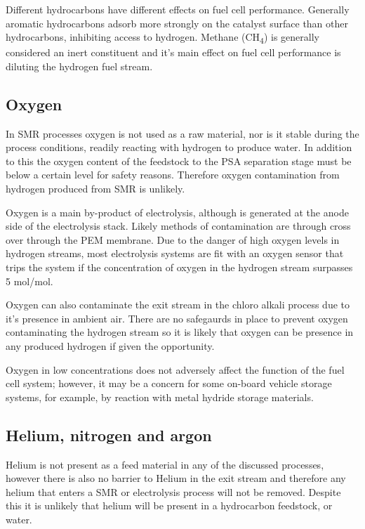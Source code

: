 Different hydrocarbons have different effects on fuel cell performance. Generally aromatic hydrocarbons adsorb more strongly on the catalyst surface than other hydrocarbons, inhibiting access to hydrogen.\cite{InternationalStandardISO14687-2:20122012} Methane (CH\textsubscript{4}) is generally considered an inert constituent and it's main effect on fuel cell performance is  diluting the hydrogen fuel stream. \cite{InternationalStandardISO14687-2:20122012}

\subsection*{Oxygen}
In SMR processes oxygen is not used as a raw material, nor is it stable during the process conditions, readily reacting with hydrogen to produce water. In addition to this the oxygen content of the feedstock to the PSA separation stage must be below a certain level for safety reasons. Therefore oxygen contamination from hydrogen produced from SMR is unlikely. 

Oxygen is a main by-product of electrolysis, although is generated at the anode side of the electrolysis stack. Likely methods of contamination are through cross over through the PEM membrane. Due to the danger of high oxygen levels in hydrogen streams, most electrolysis systems are fit with an oxygen sensor that trips the system if the concentration of oxygen in the hydrogen stream surpasses 5 \textmu mol/mol. \cite{Bacquart2018}

Oxygen can also contaminate the exit stream in the chloro alkali process due to it's presence in ambient air. There are no safegaurds in place to prevent oxygen contaminating the hydrogen stream so it is likely that oxygen can be presence in any produced hydrogen if given the opportunity.\cite{Bacquart2018} 

Oxygen in low concentrations does not adversely affect the function of the fuel cell system; however, it may be a concern for some on-board vehicle storage systems, for example, by reaction with metal hydride storage materials. \cite{InternationalStandardISO14687-2:20122012} 

\subsection*{Helium, nitrogen and argon}
Helium is not present as a feed material in any of the discussed processes, however there is also no barrier to Helium in the exit stream and therefore any helium that enters a SMR or electrolysis process will not be removed. Despite this it is unlikely that helium will be present in a hydrocarbon feedstock, or water.

